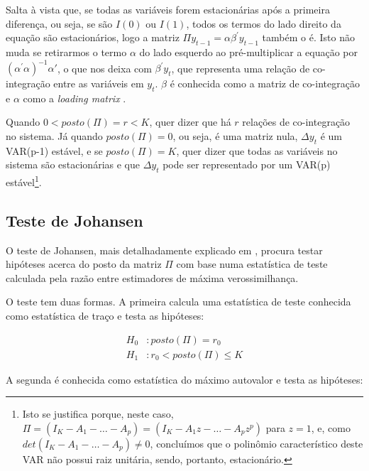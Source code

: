 \documentclass[a4paper,
               article,
               12pt,
               openany,
               oneside,
               english,
               brazil]{abntex2}
\numberwithin{equation}{section}
\begin{document}
   Salta à vista que, se todas as variáveis forem estacionárias após a primeira diferença, ou seja, se são $ I(0) $ ou $ I(1) $, todos os termos do lado direito da equação são estacionários, logo a matriz $ \Pi y_{t-1} = \alpha \beta^{'} y_{t-1} $ também o é. Isto não muda se retirarmos o termo $ \alpha $ do lado esquerdo ao pré-multiplicar a equação por $ (\alpha^{'}\alpha)^{-1}\alpha{'} $, o que nos deixa com $ \beta^{'}y_{t} $, que representa uma relação de co-integração entre as variáveis em $ y_t $. $ \beta $ é conhecida como a matriz de co-integração e $ \alpha $ como a \textit{loading matrix} \cite[p.~244-249]{lutkepool}.

   Quando $ 0 < posto(\Pi) = r < K $, quer dizer que há $ r $ relações de co-integração no sistema. Já quando $ posto(\Pi) = 0 $, ou seja, é uma matriz nula, $ \Delta y_t $ é um VAR(p-1) estável, e se $ posto(\Pi) = K $, quer dizer que todas as variáveis no sistema são estacionárias e que $ \Delta y_t $ pode ser representado por um VAR(p) estável\footnote{Isto se justifica porque, neste caso, $ \Pi = (I_K - A_1 - \dots - A_p) = (I_K - A_1z - \dots - A_pz^p) $ para $ z = 1 $, e, como $ det(I_K - A_1 - \dots - A_p) \neq 0 $, concluímos que o polinômio característico deste VAR não possui raiz unitária, sendo, portanto, estacionário.}.

   \subsection{Teste de Johansen}

   O teste de Johansen, mais detalhadamente explicado em \textcite[p.~327-330]{lutkepool}, procura testar hipóteses acerca do posto da matriz $ \Pi $ com base numa estatística de teste calculada pela razão entre estimadores de máxima verossimilhança.

   O teste tem duas formas. A primeira calcula uma estatística de teste conhecida como estatística de traço e testa as hipóteses:

   \begin{equation}
       \label{trace}
       \begin{aligned}
           H_0&: posto(\Pi) = r_0 \\
           H_1&: r_0 < posto(\Pi) \leq K
       \end{aligned}
   \end{equation}

   A segunda é conhecida como estatística do máximo autovalor e testa as hipóteses:
\end{document}
